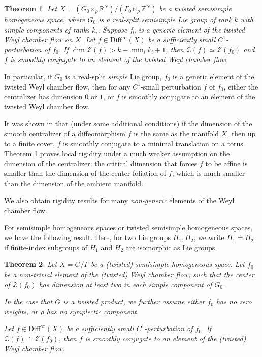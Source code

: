 \documentclass[11pt]{amsart}
\numberwithin{equation}{section}
\theoremstyle{plain}
\newtheorem{thm}{Theorem}[section]
\begin{document}
\begin{thm}\label{cenrigtwgen}
    Let \(X = (G_0 \ltimes_\rho \mathbb{R}^N) / (\Gamma_0 \ltimes_\rho \mathbb{Z}^N)\) be a twisted semisimple homogeneous space, where \(G_0\) is a real-split semisimple Lie group of rank $k$ with simple components of ranks \(k_i\). Suppose \(f_0\) is a generic element of the twisted Weyl chamber flow on \(X\). Let \(f\in \mathrm{Diff}^\infty(X)\) be a sufficiently small \(C^1\)-perturbation of \(f_0\). If \(\dim \mathcal Z(f)>k-\min_i k_i+1\), then \(\mathcal Z(f)\simeq \mathcal Z(f_0)\) and \(f\) is smoothly conjugate to an element of the twisted Weyl chamber flow.
\end{thm}

In particular, if $G_0$ is a real-split \emph{simple} Lie group, $f_0$ is a generic element of the twisted Weyl chamber flow, then for any $C^1$-small perturbation $f$ of $f_0$, either the centralizer has dimension $0$ or $1$, or $f$ is smoothly conjugate to an element of the twisted Weyl chamber flow.

It was shown in \cite{DWX23} that (under some additional conditions) if the dimension of the smooth centralizer of a diffeomorphism $f$ is the same as the manifold $X$, then up to a finite cover, $f$ is smoothly conjugate to a minimal translation on a torus. Theorem \ref{cenrigtwgen} proves local rigidity under a much weaker assumption on the dimension of the centralizer: the critical dimension that forces $f$ to be affine is smaller than the dimension of the center foliation of $f$, which is much smaller than the dimension of the ambient manifold.

We also obtain rigidity results for many \emph{non-generic} elements of the Weyl chamber flow. 

For semisimple homogeneous spaces or twisted semisimple homogeneous spaces, we have the following result. Here, for two Lie groups \(H_1,H_2\), we write \(H_1\doteq H_2\) if finite-index subgroups of \(H_1\) and \(H_2\) are isomorphic as Lie groups.

\begin{thm}\label{cenrignongen:twisted}
    Let \(X = G/\Gamma\) be a (twisted) semisimple homogeneous space.
    Let $f_0$ be a non-trivial element of the (twisted) Weyl chamber flow, such that the center of $\mathcal Z(f_0)$ has dimension at least two in each simple component of $G_0$.
    
    In the case that $G$ is a twisted product, we further assume either $f_0$ has no zero weights, or $\rho$ has no symplectic component.
    
    Let \(f\in \mathrm{Diff}^\infty(X)\) be a sufficiently small \(C^1\)-perturbation of \(f_0\). If \(\mathcal Z(f) \doteq \mathcal Z(f_0)\), then \(f\) is smoothly conjugate to an element of the (twisted) Weyl chamber flow.
\end{thm}
\end{document}
